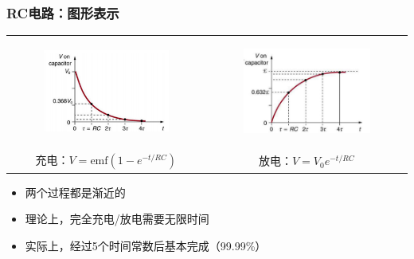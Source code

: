 \documentclass{beamer}
\begin{document}
\begin{frame}
    \frametitle{RC电路：图形表示}
    \begin{center}
        \begin{tabular}{cc}
            \begin{figure}
                \centering
                \includegraphics[width=0.5\linewidth]{phys12-circuits-capacitor-discharge-curve.png}
            \end{figure} 
            &
            \begin{figure}
                \centering
                \includegraphics[width=0.4\linewidth]{phys12-electrostatics-charge-interactions.png}
            \end{figure} \\
            充电：$V = \text{emf}(1-e^{-t/RC})$ & 放电：$V = V_0e^{-t/RC}$
        \end{tabular}
    \end{center}
    \begin{itemize}
        \item 两个过程都是渐近的
        \item 理论上，完全充电/放电需要无限时间
        \item 实际上，经过5个时间常数后基本完成（99.99\%）
    \end{itemize}
\end{frame}

\end{document}
